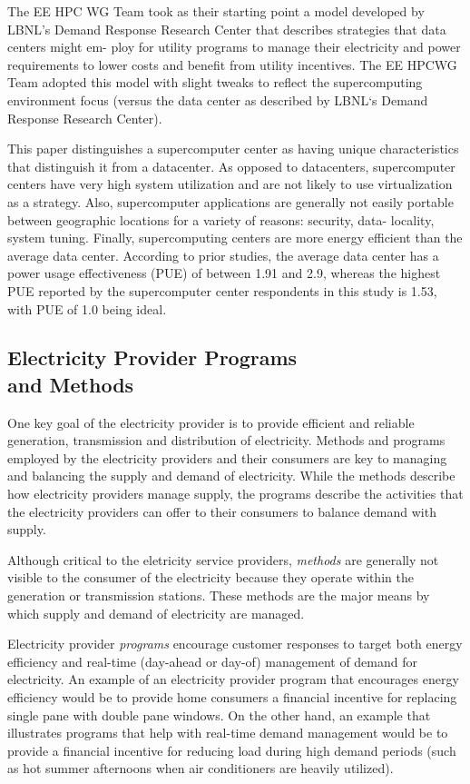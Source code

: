 The EE HPC WG Team took as their starting point a
model developed by LBNL's Demand Response Research
Center that describes strategies that data centers might em-
ploy for utility programs to manage their electricity and
power requirements to lower costs and benefit from utility
incentives. The EE HPCWG Team adopted this model with
slight tweaks to reflect the supercomputing environment
focus (versus the data center as described by LBNL`s Demand
Response Research Center).

This paper distinguishes a supercomputer center as
having unique characteristics that distinguish it from 
a datacenter. As opposed to datacenters, supercomputer
centers have very high system utilization and are not likely
to use virtualization as a strategy. Also, supercomputer
applications are generally not easily portable between
geographic locations for a variety of reasons: security, data-
locality, system tuning.  Finally, supercomputing centers are 
more energy efficient than the average data center.
According to prior studies,
the average data center has a power usage effectiveness (PUE)
of between 1.91 and 2.9, whereas the highest PUE reported by the
supercomputer center respondents in this study is 1.53, with PUE of 1.0 being ideal.

\subsection{Electricity Provider Programs\\
and Methods}
\label{sub:EPP}
One key goal of the electricity provider is to provide efficient and reliable generation, transmission and 
distribution of electricity. Methods and programs employed by the electricity providers and their consumers 
are key to managing and balancing the supply and demand of electricity. While the methods describe how 
electricity providers manage supply, the programs describe the activities that the electricity providers 
can offer to their consumers to balance demand with supply.

Although critical to the eletricity service providers, \textit{methods} 
are generally not visible to the consumer of the electricity because they
operate within the generation  or transmission stations.
These methods are the major means by which supply and demand of electricity are managed.

Electricity provider \textit{programs} encourage customer responses to target both energy efficiency and real-time
(day-ahead or day-of) management of demand for electricity. An example of an electricity provider program 
that encourages energy efficiency would be to provide home consumers a financial incentive for replacing 
single pane with double pane windows.  On the other hand, an example that illustrates programs that help 
with real-time demand management would be to provide a financial incentive for reducing load during high demand periods 
(such as hot summer afternoons when air conditioners are heavily utilized). 


